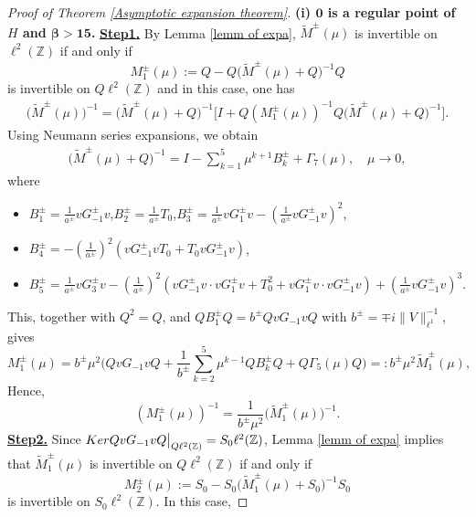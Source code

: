 \documentclass[10pt,a4paper]{amsart}
\newcommand\Z{\mathbb{Z}}
\numberwithin{equation}{section}
\begin{document}
\begin{proof}[Proof of Theorem {\rm\ref{Asymptotic expansion theorem}}]{\bf{(i) ${\bm{0}}$ is a regular point of $H$ and {$\bm{\beta>15}$}.}}
{\bf{\underline{Step1.}}} By Lemma \ref{lemm of expa}, $\widetilde{M}^{\pm}(\mu)$ is invertible on $\ell^{2}(\Z)$ if and only if $$ M^{\pm}_1(\mu):=Q-Q\big(\widetilde{M}^{\pm}(\mu)+Q\big)^{-1}Q$$ is invertible on $Q\ell^{2}(\Z)$ and in this case, one has
\begin{align}\label{Relat of M tuta and M1}
\big(\widetilde{M}^{\pm}(\mu)\big)^{-1}=\big(\widetilde{M}^{\pm}(\mu)+Q\big)^{-1}\Big[I+Q\left(M^{\pm}_1(\mu)\right)^{-1}Q\big(\widetilde{M}^{\pm}(\mu)+Q\big)^{-1}\Big].
\end{align}
Using Neumann series expansions, we obtain 
\begin{align}\label{expr of Bkpm}
\big(\widetilde{M}^{\pm}(\mu)+Q\big)^{-1}=I-\sum\limits_{k=1}^{5}\mu^{k+1}B^{\pm}_{k}+\Gamma_7(\mu),\quad \mu\rightarrow0,
\end{align}
where
\begin{itemize}
\item $B^{\pm}_{1}=\frac{1}{a^{\pm}}vG^{\pm}_{-1}v$,\quad$B^{\pm}_{2}=\frac{1}{a^{\pm}}T_0$,\quad $B^{\pm}_{3}=\frac{1}{a^{\pm}}vG^{\pm}_{1}v-\left(\frac{1}{a^{\pm}}vG^{\pm}_{-1}v\right)^2$,
\vskip0.2cm
\item $B^{\pm}_{4}=-\left(\frac{1}{a^{\pm}}\right)^2\left(vG^{\pm}_{-1}vT_0+T_0vG^{\pm}_{-1}v\right)$,
\item
$B^{\pm}_{5}=\frac{1}{a^{\pm}}vG^{\pm}_{3}v-\left(\frac{1}{a^{\pm}}\right)^2\left(vG^{\pm}_{-1}v\cdot vG^{\pm}_{1}v+T^2_0+vG^{\pm}_{1}v \cdot vG^{\pm}_{-1}v\right)+\left(\frac{1}{a^{\pm}}vG^{\pm}_{-1}v\right)^3$.
\end{itemize}
This, together with $Q^2=Q$, and $QB^{\pm}_1Q=b^{\pm}QvG_{-1}vQ$ with $b^{\pm}=\mp i\|V\|^{-1}_{\ell^1}$, gives
\begin{equation*}
M^{\pm}_1(\mu)=b^{\pm}\mu^2\Big(QvG_{-1}vQ+\frac{1}{b^{\pm}}\sum\limits_{k=2}^{5}\mu^{k-1}QB^{\pm}_{k}Q+Q\Gamma_5(\mu)Q\Big)=:b^{\pm}\mu^2\widetilde{M}^{\pm}_1(\mu),
\end{equation*}
Hence,
\begin{equation}\label{Relat of M1 and M1 tuta}
\left(M^{\pm}_1(\mu)\right)^{-1}=\frac{1}{b^{\pm}\mu^2}\big(\widetilde{M}_{1}^{\pm}(\mu)\big)^{-1}.
\end{equation}
\vskip0.15cm
{\bf{\underline{Step2.}}} Since ${\rm Ker}QvG_{-1}vQ\big|_{Q\ell^2(\Z)}=S_0\ell^{2}(\Z)$, Lemma \ref{lemm of expa} implies that $\widetilde{M}_{1}^{\pm}(\mu)$ is invertible on $Q\ell^{2}(\Z)$ if and only if $$M^{\pm}_{2}(\mu):=S_0-S_0\big(\widetilde{M}_{1}^{\pm}(\mu)+S_0\big)^{-1}S_0$$ is invertible on $S_0\ell^{2}(\Z)$. In this case,

\end{proof}
\end{document}

